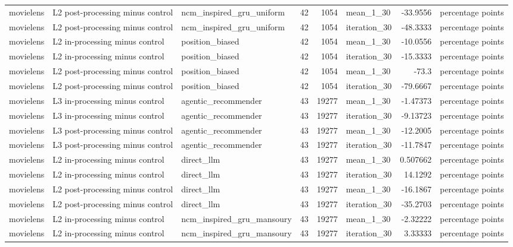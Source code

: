 \begin{table}[htbp!]
\begin{tabular}{lllrrlrl}
movielens & L2 post-processing minus control & ncm\_inspired\_gru\_uniform & 42 & 1054 & mean\_1\_30 & -33.9556 & percentage points \\
movielens & L2 post-processing minus control & ncm\_inspired\_gru\_uniform & 42 & 1054 & iteration\_30 & -48.3333 & percentage points \\
movielens & L2 in-processing minus control & position\_biased & 42 & 1054 & mean\_1\_30 & -10.0556 & percentage points \\
movielens & L2 in-processing minus control & position\_biased & 42 & 1054 & iteration\_30 & -15.3333 & percentage points \\
movielens & L2 post-processing minus control & position\_biased & 42 & 1054 & mean\_1\_30 & -73.3 & percentage points \\
movielens & L2 post-processing minus control & position\_biased & 42 & 1054 & iteration\_30 & -79.6667 & percentage points \\
movielens & L3 in-processing minus control & agentic\_recommender & 43 & 19277 & mean\_1\_30 & -1.47373 & percentage points \\
movielens & L3 in-processing minus control & agentic\_recommender & 43 & 19277 & iteration\_30 & -9.13723 & percentage points \\
movielens & L3 post-processing minus control & agentic\_recommender & 43 & 19277 & mean\_1\_30 & -12.2005 & percentage points \\
movielens & L3 post-processing minus control & agentic\_recommender & 43 & 19277 & iteration\_30 & -11.7847 & percentage points \\
movielens & L2 in-processing minus control & direct\_llm & 43 & 19277 & mean\_1\_30 & 0.507662 & percentage points \\
movielens & L2 in-processing minus control & direct\_llm & 43 & 19277 & iteration\_30 & 14.1292 & percentage points \\
movielens & L2 post-processing minus control & direct\_llm & 43 & 19277 & mean\_1\_30 & -16.1867 & percentage points \\
movielens & L2 post-processing minus control & direct\_llm & 43 & 19277 & iteration\_30 & -35.2703 & percentage points \\
movielens & L2 in-processing minus control & ncm\_inspired\_gru\_mansoury & 43 & 19277 & mean\_1\_30 & -2.32222 & percentage points \\
movielens & L2 in-processing minus control & ncm\_inspired\_gru\_mansoury & 43 & 19277 & iteration\_30 & 3.33333 & percentage points \\

\end{tabular}
\end{table}
